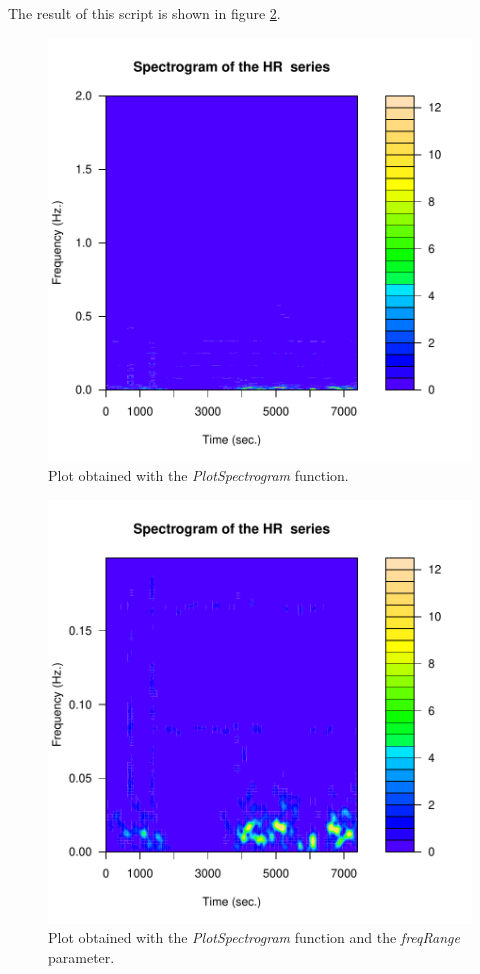 \documentclass[12pt,lot, lof]{puthesis}
\begin{document}
The result of this script is shown in figure \ref{fig:plottingSpectrogram2}.
\begin{figure}[h]
\centering
\includegraphics{figures/tutorial-plottingSpectrogram}
\caption{Plot obtained with the \textit{PlotSpectrogram} 
function.\label{fig:plottingSpectrogram}}
\end{figure}


\begin{figure}[h]
\centering
\includegraphics{figures/tutorial-plottingSpectrogram2}
\caption[Plotting with the \textit{PlotSpectrogram} function using the 
\textit{freqRange} parameter]{Plot obtained with the \textit{PlotSpectrogram} 
function and the \textit{freqRange} parameter.\label{fig:plottingSpectrogram2}}
\end{figure}
\end{document}
